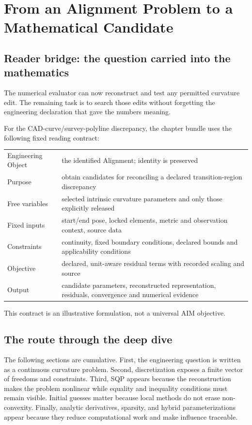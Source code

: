\chapter{From an Alignment Problem to a Mathematical Candidate}

\section*{Reader bridge: the question carried into the mathematics}

The numerical evaluator can now reconstruct and test any permitted curvature
edit. The remaining task is to search those edits without forgetting the
engineering declaration that gave the numbers meaning.

For the CAD-curve/survey-polyline discrepancy, the chapter bundle uses the
following fixed reading contract:
\begin{center}
\begin{tabular}{p{}p{}}
\toprule
Engineering Object & the identified Alignment; identity is preserved\\
Purpose & obtain candidates for reconciling a declared transition-region discrepancy\\
Free variables & selected intrinsic curvature parameters and only those explicitly released\\
Fixed inputs & start/end pose, locked elements, metric and observation context, source data\\
Constraints & continuity, fixed boundary conditions, declared bounds and applicability conditions\\
Objective & declared, unit-aware residual terms with recorded scaling and source\\
Output & candidate parameters, reconstructed representation, residuals, convergence and numerical evidence\\
\bottomrule
\end{tabular}
\end{center}
This contract is an illustrative formulation, not a universal AIM objective.

\section*{The route through the deep dive}

The following sections are cumulative. First, the engineering question is
written as a continuous curvature problem. Second, discretization exposes a
finite vector of freedoms and constraints. Third, SQP appears because the
reconstruction makes the problem nonlinear while equality and inequality
conditions must remain visible. Initial guesses matter because local methods
do not erase non-convexity. Finally, analytic derivatives, sparsity, and hybrid
parameterizations appear because they reduce computational work and make
influence traceable.

